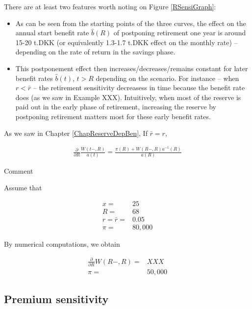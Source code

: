 \documentclass{book}
\newcommand{\1}[1]{\mathbbm{1}_{\left\lbrace #1 \right\rbrace}}
\theoremstyle{break}
\theoremstyle{remark}
\newenvironment{remark}
  {\pushQED{\qed}\renewcommand{\qedsymbol}{\scalebox{1.4}{$\circ$}}\remarkx}
  {\popQED\endremarkx}
\numberwithin{equation}{section}
\begin{document}
\begin{example}
There are at least two features worth noting on Figure \ref{RSensiGraph}:

\begin{itemize}
	\item As can be seen from the starting points of the three curves, the effect on the annual start benefit rate $\hat{b}(R)$ of postponing retirement one year is around 15-20 t.DKK (or equivalently 1.3-1.7 t.DKK effect on the monthly rate) -- depending on the rate of return in the savings phase.
	\item This postponement effect then increases/decreases/remains constant for later benefit rates $\hat{b}(t)$, $t>R$ depending on the scenario. For instance -- when $r < \bar{r}$ -- the retirement sensitivity decreasess in time because the benefit rate does (as we saw in Example XXX). Intuitively, when most of the reserve is paid out in the early phase of retirement, increasing the reserve by postponing retirement matters most for these early benefit rates.
\end{itemize}

\end{example}

\begin{remark}
As we saw in Chapter \ref{ChapReserveDepBen}, If $\bar{r}=r$, 

\begin{align*}
	\frac{\partial}{\partial R} \frac{W(t-,R)}{a(t)} = \frac{\pi (R) + W(R-,R) a^{-1}(R)}{a(R)}
\end{align*}
\end{remark}

Comment

\begin{example}
	Assume that
	
	\begin{align*}
		x =& 25 \\
		R =& 68 \\
		r = \bar{r} =& 0.05 \\
		\pi =& 80,000
	\end{align*}

	By numerical computations, we obtain
	
	\begin{align*}
		\frac{\partial}{\partial R} W(R-,R) =& XXX \\
		\pi =& 50,000
	\end{align*}
\end{example}

\subsection{Premium sensitivity}
\end{document}
